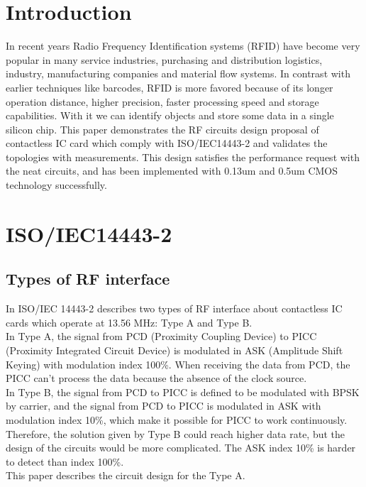 \documentclass{article} %
\begin{document}
\begin{multicols}{2}



\section{ Introduction}

In recent years Radio Frequency Identification systems
(RFID) \cite{c1} have become very popular in many service industries,
purchasing and distribution logistics, industry, manufacturing
companies and material flow systems. In contrast
with earlier techniques like barcodes, RFID is more favored
because of its longer operation distance, higher precision,
faster processing speed and storage capabilities. With it we
can identify objects and store some data in a single silicon
chip. This paper demonstrates the RF circuits design proposal
of contactless IC card which comply with ISO/IEC14443-2 \cite{c2}
and validates the topologies with measurements. This design
satisfies the performance request with the neat circuits, and has
been implemented with 0.13um and 0.5um CMOS technology
successfully.

\section{ISO/IEC14443-2}

\subsection{Types of RF interface}

In ISO/IEC 14443-2 describes two types of RF interface about contactless IC cards which operate at 13.56 MHz: Type A and Type B. \\
In Type A, the signal from PCD (Proximity Coupling Device) to PICC (Proximity Integrated Circuit Device) is modulated in ASK (Amplitude Shift Keying) with modulation index 100\%. When receiving the data from PCD, the PICC can’t process the data because the absence of the clock source. \\
In Type B, the signal from PCD to PICC is defined to be modulated with BPSK by carrier, and the signal from PCD to PICC is modulated in ASK with modulation index 10\%, which make it possible for PICC to work continuously. Therefore, the solution given by Type B could reach higher data rate, but the design of the circuits would be more complicated. The ASK index 10\% is harder to detect than index 100\%. \\
This paper describes the circuit design for the Type A.


\end{multicols}
\end{document}
